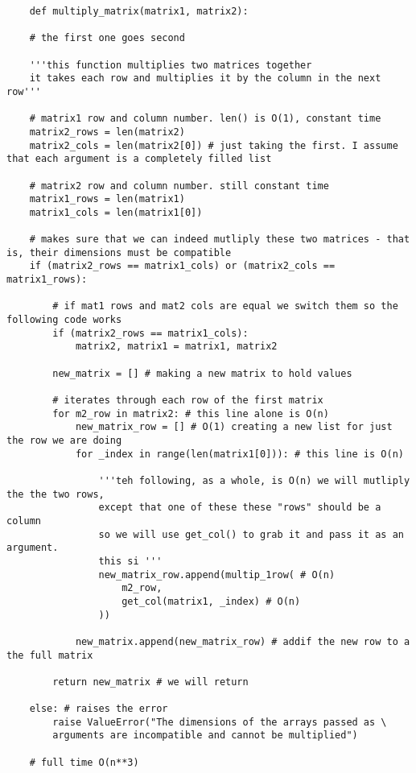 \documentclass[12pt, a4paper]{article}
\begin{document}
\begin{lstlisting}
    def multiply_matrix(matrix1, matrix2):

    # the first one goes second

    '''this function multiplies two matrices together
    it takes each row and multiplies it by the column in the next row'''

    # matrix1 row and column number. len() is O(1), constant time
    matrix2_rows = len(matrix2) 
    matrix2_cols = len(matrix2[0]) # just taking the first. I assume that each argument is a completely filled list

    # matrix2 row and column number. still constant time
    matrix1_rows = len(matrix1)
    matrix1_cols = len(matrix1[0])

    # makes sure that we can indeed mutliply these two matrices - that is, their dimensions must be compatible
    if (matrix2_rows == matrix1_cols) or (matrix2_cols == matrix1_rows): 

        # if mat1 rows and mat2 cols are equal we switch them so the following code works
        if (matrix2_rows == matrix1_cols):
            matrix2, matrix1 = matrix1, matrix2

        new_matrix = [] # making a new matrix to hold values

        # iterates through each row of the first matrix
        for m2_row in matrix2: # this line alone is O(n)
            new_matrix_row = [] # O(1) creating a new list for just the row we are doing
            for _index in range(len(matrix1[0])): # this line is O(n)

                '''teh following, as a whole, is O(n) we will mutliply the the two rows,
                except that one of these these "rows" should be a column
                so we will use get_col() to grab it and pass it as an argument. 
                this si '''
                new_matrix_row.append(multip_1row( # O(n)
                    m2_row,
                    get_col(matrix1, _index) # O(n)
                ))
            
            new_matrix.append(new_matrix_row) # addif the new row to a the full matrix

        return new_matrix # we will return

    else: # raises the error 
        raise ValueError("The dimensions of the arrays passed as \
        arguments are incompatible and cannot be multiplied")
    
    # full time O(n**3)
\end{lstlisting}
\end{document}

